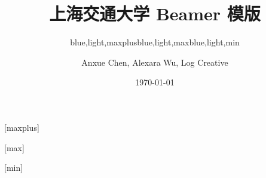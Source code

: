 \documentclass[]{ctexbeamer}
\begin{document}
\title[SJTU Beamer Template] %
{\textbf{上海交通大学 Beamer 模版}} %

\author[Anxue Chen, Alexara Wu, Log Creative]
{Anxue Chen, Alexara Wu, Log Creative}


\date{\today}

\subtitle{blue,light,maxplus}
\logo{\resizebox{!}{0.7cm}{\zhlogo}}
[maxplus]
\maketitle

\subtitle{blue,light,max}
\logo{\resizebox{!}{1cm}{\sjtubadge}}
\titlegraphic{\sjtubg[opacity=0.2]}
[max]
\maketitle

\subtitle{blue,light,min}
\logo{\resizebox{!}{0.7cm}{\enlogo}}
[min]
\maketitle
\end{document}

